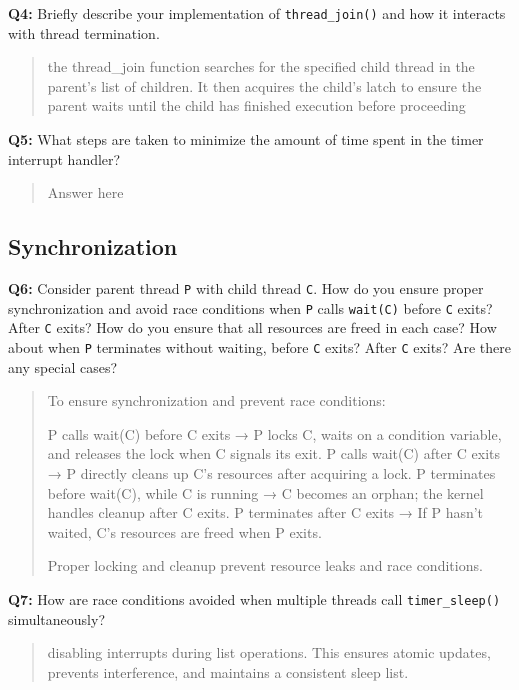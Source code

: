 \documentclass[a4paper,11pt]{paper}
\begin{document}
\textbf{Q4:} Briefly describe your implementation of \texttt{thread\_join()} and
how it interacts with thread termination.

\begin{quote}
   the thread_join function searches for the specified child thread in the parent's list of children. It then acquires the child's latch to ensure the parent waits until the child has finished execution before proceeding
\end{quote}

\textbf{Q5:} What steps are taken to minimize the amount of time spent in the
timer interrupt handler?

\begin{quote}
  Answer here
\end{quote}


\subsection{Synchronization}

\textbf{Q6:} Consider parent thread \texttt{P} with child thread \texttt{C}.
How do you ensure proper synchronization and avoid race conditions when
\texttt{P} calls \texttt{wait(C)} before \texttt{C} exits?  After \texttt{C}
exits?  How do you ensure that all resources are freed in each case?  How about
when \texttt{P} terminates without waiting, before \texttt{C} exits?  After
\texttt{C} exits?  Are there any special cases?

\begin{quote}
To ensure synchronization and prevent race conditions:

    P calls wait(C) before C exits → P locks C, waits on a condition variable, and releases the lock when C signals its exit.
    P calls wait(C) after C exits → P directly cleans up C’s resources after acquiring a lock.
    P terminates before wait(C), while C is running → C becomes an orphan; the kernel handles cleanup after C exits.
    P terminates after C exits → If P hasn’t waited, C’s resources are freed when P exits.

Proper locking and cleanup prevent resource leaks and race conditions.
\end{quote}

\textbf{Q7:} How are race conditions avoided when multiple threads call
\texttt{timer\_sleep()} simultaneously?

\begin{quote}
disabling interrupts during list operations. This ensures atomic updates, prevents interference, and maintains a consistent sleep list.\end{quote}
\end{document}
